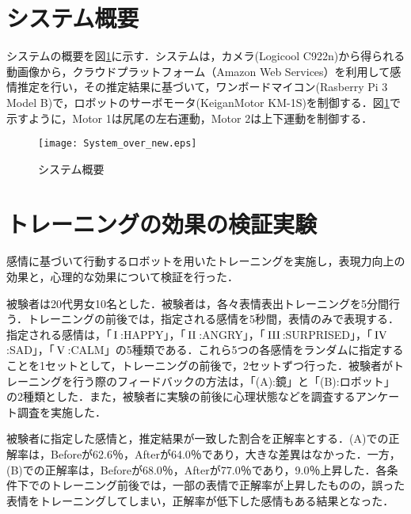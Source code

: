 \documentclass[twocolumn,a4j]{jarticle}
\begin{document}
\section{システム概要}
\vspace{-2mm}
システムの概要を図\ref{System Overview}に示す．システムは，カメラ(Logicool C922n)から得られる動画像から，クラウドプラットフォーム（Amazon Web Services）を利用して感情推定を行い，その推定結果に基づいて，ワンボードマイコン(Rasberry Pi 3 Model B)で，ロボットのサーボモータ(KeiganMotor KM-1S)を制御する．図\ref{System Overview}で示すように，Motor 1は尻尾の左右運動，Motor 2は上下運動を制御する．
\vspace{-2mm}
\begin{figure}[h]
\begin{center}
\texttt{[image: System\_over\_new.eps]}
\end{center}
\vspace{-8mm}
\caption{システム概要}
\label{System Overview} %
\end{figure}
\vspace{-8mm}
\section{トレーニングの効果の検証実験}
\vspace{-2mm}
感情に基づいて行動するロボットを用いたトレーニングを実施し，表現力向上の効果と，心理的な効果について検証を行った．

被験者は20代男女10名とした．被験者は，各々表情表出トレーニングを5分間行う．トレーニングの前後では，指定される感情を5秒間，表情のみで表現する．指定される感情は，「$\rm\,I\,$:HAPPY」，「$\rm\,II\,$:ANGRY」，「$\rm\,III\,$:SURPRISED」，「$\rm\,IV\,$:SAD」，「$\rm\,
V\,$:CALM」の5種類である．これら5つの各感情をランダムに指定することを1セットとして，トレーニングの前後で，2セットずつ行った．被験者がトレーニングを行う際のフィードバックの方法は，「(A):鏡」と「(B):ロボット」の2種類とした．また，被験者に実験の前後に心理状態などを調査するアンケート調査を実施した\cite{hayashi}．

被験者に指定した感情と，推定結果が一致した割合を正解率とする．(A)での正解率は，Beforeが62.6$％$，Afterが64.0$％$であり，大きな差異はなかった．一方，(B)での正解率は，Beforeが68.0$％$，Afterが77.0$％$であり，9.0$％$上昇した．各条件下でのトレーニング前後では，一部の表情で正解率が上昇したものの，誤った表情をトレーニングしてしまい，正解率が低下した感情もある結果となった．
\end{document}
